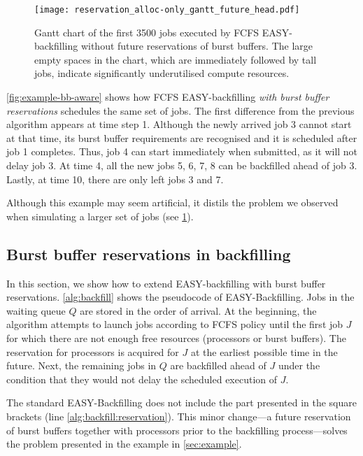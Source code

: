 \documentclass[runningheads]{llncs}
\begin{document}
\begin{figure}[tb]
  \setlength{}
  \centering
  \texttt{[image: reservation\_alloc-only\_gantt\_future\_head.pdf]}
  \caption{Gantt chart of the first 3500 jobs executed by FCFS EASY-backfilling without future reservations of burst buffers. The large empty spaces in the chart, which are immediately followed by tall jobs, indicate significantly underutilised compute resources.}
  \label{fig:gantt}
\end{figure}

\cref{fig:example-bb-aware} shows how FCFS EASY-backfilling \emph{with burst buffer reservations} schedules the same set of jobs. The first difference from the previous algorithm appears at time step 1. Although the newly arrived job 3 cannot start at that time, its burst buffer requirements are recognised and it is scheduled after job 1 completes. Thus, job 4 can start immediately when submitted, as it will not delay job 3. At time 4, all the new jobs 5, 6, 7, 8 can be backfilled ahead of job 3. Lastly, at time 10, there are only left jobs 3 and 7.

Although this example may seem artificial, it distils the problem we observed when simulating a larger set of jobs (see \cref{fig:gantt}).

\subsection{Burst buffer reservations in backfilling}\label{sec:bb-backfill}
In this section, we show how to extend EASY-backfilling with burst buffer reservations. 
\cref{alg:backfill} shows the pseudocode of EASY-Backfilling. Jobs in the waiting queue $Q$ are stored in the order of arrival. At the beginning, the algorithm attempts to launch jobs according to FCFS policy until the first job $J$ for which there are not enough free resources (processors or burst buffers). The reservation for processors is acquired for $J$ at the earliest possible time in the future. Next, the remaining jobs in $Q$ are backfilled ahead of $J$ under the condition that they would not delay the scheduled execution of $J$.

The standard EASY-Backfilling does not include the part presented in the square brackets (line \ref{alg:backfill:reservation}). This minor change---a future reservation of burst buffers together with processors prior to the backfilling process---solves the problem presented in the example in \cref{sec:example}. %
\end{document}
